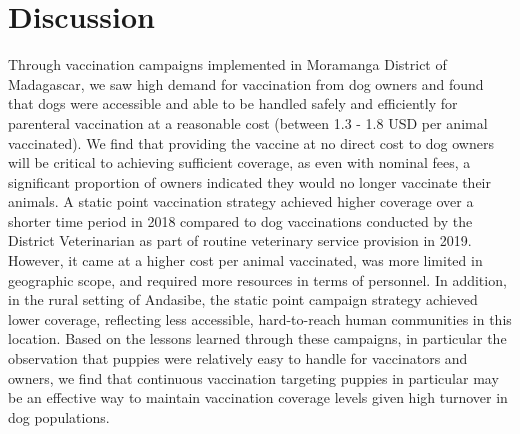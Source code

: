 \documentclass[tropicalmed,article,submit,moreauthors,pdftex]{mdpi}
\begin{document}
\hypertarget{discussion}{%
\section{Discussion}\label{discussion}}

Through vaccination campaigns implemented in Moramanga District of
Madagascar, we saw high demand for vaccination from dog owners and found
that dogs were accessible and able to be handled safely and efficiently
for parenteral vaccination at a reasonable cost (between 1.3 - 1.8 USD
per animal vaccinated). We find that providing the vaccine at no direct
cost to dog owners will be critical to achieving sufficient coverage, as
even with nominal fees, a significant proportion of owners indicated
they would no longer vaccinate their animals. A static point vaccination
strategy achieved higher coverage over a shorter time period in 2018
compared to dog vaccinations conducted by the District Veterinarian as
part of routine veterinary service provision in 2019. However, it came
at a higher cost per animal vaccinated, was more limited in geographic
scope, and required more resources in terms of personnel. In addition,
in the rural setting of Andasibe, the static point campaign strategy
achieved lower coverage, reflecting less accessible, hard-to-reach human
communities in this location. Based on the lessons learned through these
campaigns, in particular the observation that puppies were relatively
easy to handle for vaccinators and owners, we find that continuous
vaccination targeting puppies in particular may be an effective way to
maintain vaccination coverage levels given high turnover in dog
populations.
\end{document}
